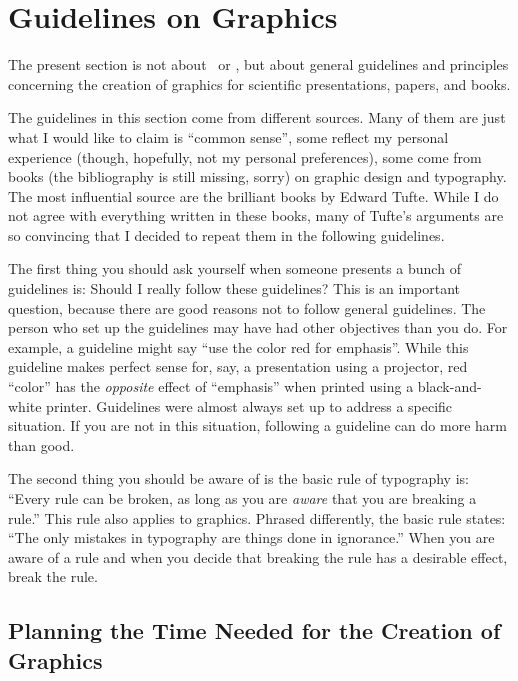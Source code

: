 %
%
%


\section{Guidelines on Graphics}

The present section is not about \pgfname\ or \tikzname, but about general
guidelines and principles concerning the creation of graphics for scientific
presentations, papers, and books.

The guidelines in this section come from different sources. Many of them are
just what I would like to claim is ``common sense'', some reflect my personal
experience (though, hopefully, not my personal preferences), some come from
books (the bibliography is still missing, sorry) on graphic design and
typography. The most influential source  are the brilliant books by Edward
Tufte. While I do not agree with everything written in these books, many of
Tufte's arguments are so convincing that I decided to repeat them in the
following guidelines.

The first thing you should ask yourself when someone presents a bunch of
guidelines is: Should I really follow these guidelines? This is an important
question, because there are good reasons not to follow general guidelines. The
person who set up the guidelines may have had other objectives than you do. For
example, a guideline might say ``use the color red for emphasis''. While this
guideline makes perfect sense for, say, a presentation using a projector, red
``color'' has the \emph{opposite} effect of ``emphasis'' when printed using a
black-and-white printer. Guidelines were almost always set up to address a
specific situation. If you are not in this situation, following a guideline can
do more harm than good.

The second thing you should be aware of is the basic rule of typography is:
``Every rule can be broken, as long as you are \emph{aware} that you are
breaking a rule.'' This rule also applies to graphics. Phrased differently, the
basic rule states: ``The only mistakes in typography are things done in
ignorance.'' When you are aware of a rule and when you decide that breaking the
rule has a desirable effect, break the rule.


\subsection{Planning the Time Needed for the Creation of Graphics}

